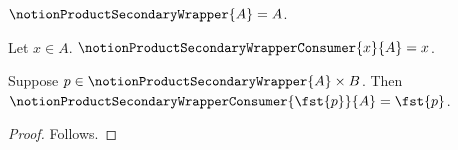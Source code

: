 

\begin{abbreviation}\label{notion_product_secondary_wrapper}
    $\notionProductSecondaryWrapper{A}=A$.
\end{abbreviation}

\begin{definition}\label{notion_product_secondary_wrapper_consumer}
    Let $x\in A$.
    $\notionProductSecondaryWrapperConsumer{x}{A}=x$.
\end{definition}

\begin{proposition}\label{notion_product_secondary_wrapper_preserves_membership}
    Suppose $p\in\notionProductSecondaryWrapper{A}\times B$.
    Then $\notionProductSecondaryWrapperConsumer{\fst{p}}{A}=\fst{p}$.
\end{proposition}
\begin{proof}
    Follows.
\end{proof}
